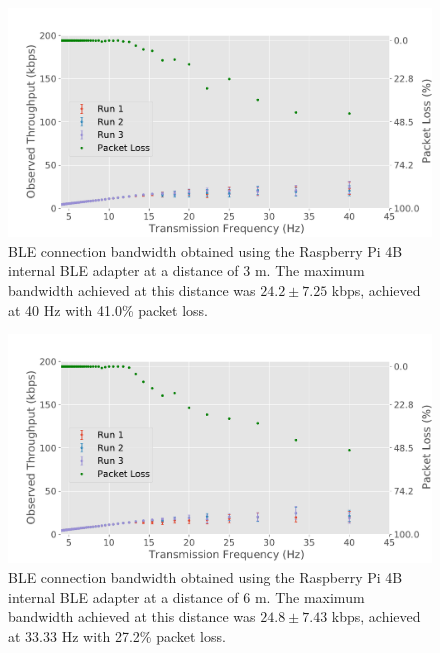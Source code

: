 \begin{figure}[H]
    \centering
    \includegraphics[width=0.9\linewidth]{images/ble-bandwidth-hci1-300cm.pdf}
    \caption[\acs{BLE} connection bandwidth obtained using the ASUS USB-BT500 adapter at a distance of 3 m.]    {\acs{BLE} connection bandwidth obtained using the Raspberry Pi 4B internal \acs{BLE} adapter at a distance of 3 m. The maximum bandwidth achieved at this distance was $24.2 \pm 7.25$ kbps, achieved at 40 Hz with 41.0\% packet loss.}
    \label{fig:ble-bandwidth-hci1-3m}
\end{figure}

\begin{figure}[H]
    \centering
    \includegraphics[width=0.9\linewidth]{images/ble-bandwidth-hci1-600cm.pdf}
    \caption[\acs{BLE} connection bandwidth obtained using the ASUS USB-BT500 adapter at a distance of 6 m.]{\acs{BLE} connection bandwidth obtained using the Raspberry Pi 4B internal \acs{BLE} adapter at a distance of $6\text{ m}$. The maximum bandwidth achieved at this distance was $24.8 \pm 7.43$ kbps, achieved at 33.33 Hz with 27.2\% packet loss.}
    \label{fig:ble-bandwidth-hci1-6m}
\end{figure}

